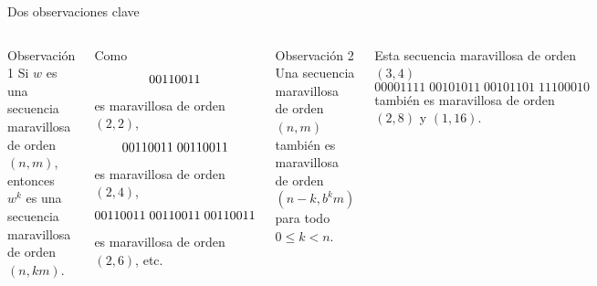 \documentclass[spanish,xcolor={table}]{beamer}
\begin{document}

\begin{frame}{Dos observaciones clave}

\begin{columns}

  \begin{block}{Observación 1}
    Si $w$ es una secuencia maravillosa de orden $(n,m)$, entonces \\
    $w^k$ es una secuencia maravillosa de orden $(n,km)$.
  \end{block}
  
  \begin{example}
    Como \vspace{-.4em}
    \[ 00110011 \vspace{-.4em} \]
    es maravillosa de orden $(2,2)$, \vspace{-.4em}
    \[ 00110011\;00110011 \vspace{-.4em} \]
    es maravillosa de orden $(2,4)$, \vspace{-.4em}
    \[ 00110011\;00110011\;00110011 \vspace{-.4em} \]
    es maravillosa de orden $(2,6)$, etc.
  \end{example}
  \pause

  \begin{block}{Observación 2}
    Una secuencia maravillosa \\
    de orden $(n,m)$ también es
    maravillosa de orden $(n-k,b^km)$
    para todo $0 \leq k < n$.
  \end{block}
  
  \begin{example}
    Esta secuencia maravillosa de orden $(3,4)$
    {\small
      \[ 00001111\;00101011\;00101101\;11100010 \]
    }
    también es maravillosa de orden $(2,8)$ y $(1,16)$.
  \end{example}
\end{columns}

\end{frame}

\end{document}

